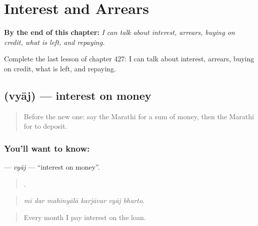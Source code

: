
\chapter{Interest and Arrears}
\label{ch:mr-interest-and-arrears}

\begin{chapteropening}
\textbf{By the end of this chapter:} \emph{I can talk about interest, arrears, buying on credit, what is left, and repaying.}

Complete the last lesson of chapter 427: I can talk about interest, arrears, buying on credit, what is left, and repaying.
\end{chapteropening}

\section[\texorpdfstring{\mr{व्याज} (vyāj)}{व्याज (vyāj)}]{ (vyāj) — interest on money}

\label{lesson:MR-C427-vyaj}



\begin{quote}
Before the new one: say the Marathi for a sum of money, then the Marathi for to deposit.
\end{quote}

\subsection*{You'll want to know: }
\textbf{} — \emph{vyāj} — \textquotedblleft{}interest on money\textquotedblright{}.

\begin{quote}
     .
\end{quote}

\begin{quote}
\emph{mī dar mahinyālā karjāvar vyāj bharto.}
\end{quote}

\begin{quote}
Every month I pay interest on the loan.
\end{quote}

